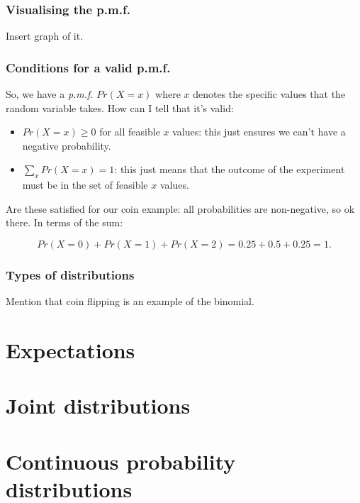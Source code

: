 \documentclass{beamer}
\begin{document}
	\begin{frame}
		\frametitle{Visualising the p.m.f.}
		
		Insert graph of it.
		
	\end{frame}
	
	\begin{frame}
		\frametitle{Conditions for a valid p.m.f.}
		
		So, we have a \textit{p.m.f.} $Pr(X=x)$ where $x$ denotes the specific values that the random variable takes. How can I tell that it's valid:
		
		\begin{itemize}
			\item $Pr(X=x) \geq 0$ for all feasible $x$ values: this just ensures we can't have a negative probability.
			\item $\sum_{x} Pr(X=x) = 1$: this just means that the outcome of the experiment must be in the set of feasible $x$ values.
		\end{itemize}
		
		Are these satisfied for our coin example: all probabilities are non-negative, so ok there. In terms of the sum:
		
		\begin{equation}
		Pr(X=0) + Pr(X=1) + Pr(X=2) = 0.25 + 0.5 + 0.25 = 1.
		\end{equation}
		
	\end{frame}
	
	\begin{frame}
		\frametitle{Types of distributions}
		Mention that coin flipping is an example of the binomial.
		
	\end{frame}
	
	\section{Expectations}
	\frame{\tableofcontents[currentsection]}

	\section{Joint distributions}
	\frame{\tableofcontents[currentsection]}
	
	\section{Continuous probability distributions}
	\frame{\tableofcontents[currentsection]}
	
\end{document}
